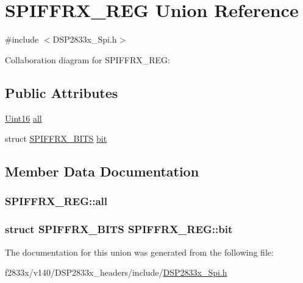 \hypertarget{union_s_p_i_f_f_r_x___r_e_g}{}\section{S\+P\+I\+F\+F\+R\+X\+\_\+\+R\+E\+G Union Reference}
\label{union_s_p_i_f_f_r_x___r_e_g}


{\ttfamily \#include $<$D\+S\+P2833x\+\_\+\+Spi.\+h$>$}



Collaboration diagram for S\+P\+I\+F\+F\+R\+X\+\_\+\+R\+E\+G\+:
\subsection*{Public Attributes}
\begin{DoxyCompactItemize}
\item 
\hyperlink{_d_s_p2833x___device_8h_a59a9f6be4562c327cbfb4f7e8e18f08b}{Uint16} \hyperlink{union_s_p_i_f_f_r_x___r_e_g_a9b71d9b9b85956acce27ce82f11571f8}{all}
\item 
struct \hyperlink{struct_s_p_i_f_f_r_x___b_i_t_s}{S\+P\+I\+F\+F\+R\+X\+\_\+\+B\+I\+T\+S} \hyperlink{union_s_p_i_f_f_r_x___r_e_g_a49831f2febd97af24a3f2e45e6acc28b}{bit}
\end{DoxyCompactItemize}


\subsection{Member Data Documentation}
\hypertarget{union_s_p_i_f_f_r_x___r_e_g_a9b71d9b9b85956acce27ce82f11571f8}{}
\subsubsection[{all}]{ S\+P\+I\+F\+F\+R\+X\+\_\+\+R\+E\+G\+::all}\label{union_s_p_i_f_f_r_x___r_e_g_a9b71d9b9b85956acce27ce82f11571f8}
\hypertarget{union_s_p_i_f_f_r_x___r_e_g_a49831f2febd97af24a3f2e45e6acc28b}{}
\subsubsection[{bit}]{\setlength{\rightskip}{0pt plus 5cm}struct {\bf S\+P\+I\+F\+F\+R\+X\+\_\+\+B\+I\+T\+S} S\+P\+I\+F\+F\+R\+X\+\_\+\+R\+E\+G\+::bit}\label{union_s_p_i_f_f_r_x___r_e_g_a49831f2febd97af24a3f2e45e6acc28b}


The documentation for this union was generated from the following file\+:\begin{DoxyCompactItemize}
\item 
f2833x/v140/\+D\+S\+P2833x\+\_\+headers/include/\hyperlink{_d_s_p2833x___spi_8h}{D\+S\+P2833x\+\_\+\+Spi.\+h}\end{DoxyCompactItemize}
